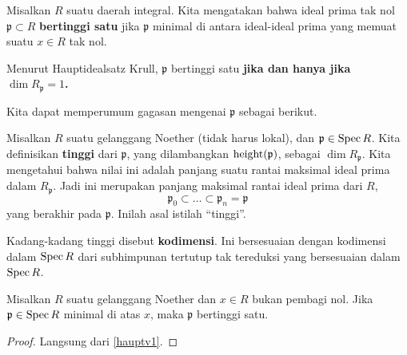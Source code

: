 \begin{remark} 
Misalkan $R$ suatu daerah integral. Kita mengatakan bahwa ideal prima tak nol $\mathfrak{p} \subset R$
\textbf{bertinggi satu} jika $\mathfrak{p}$ minimal di antara ideal-ideal prima
yang memuat suatu $x \in R$ tak nol. 

Menurut Hauptidealsatz Krull, $\mathfrak{p}$ bertinggi satu \textbf{jika
dan hanya jika $\dim R_{\mathfrak{p}} = 1$.}
\end{remark} 


Kita dapat memperumum gagasan mengenai $\mathfrak{p}$ sebagai berikut.
\begin{definition} 
Misalkan $R$ suatu gelanggang Noether (tidak harus lokal), dan $\mathfrak{p} \in
\operatorname{Spec} R$. Kita definisikan \textbf{tinggi} dari $\mathfrak{p}$, yang dilambangkan
$\operatorname{height}(\mathfrak{p})$, sebagai $\dim R_{\mathfrak{p}}$.
Kita mengetahui bahwa nilai ini adalah panjang suatu rantai maksimal ideal prima dalam
$R_{\mathfrak{p}}$. Jadi ini merupakan panjang maksimal rantai ideal prima dari $R$, 
\[ \mathfrak{p}_0 \subset \dots \subset \mathfrak{p}_n = \mathfrak{p}  \]
yang berakhir pada $\mathfrak{p}$. Inilah asal istilah ``tinggi''.
\end{definition} 

\begin{remark} 
Kadang-kadang tinggi disebut \textbf{kodimensi}. Ini bersesuaian dengan
kodimensi dalam $\operatorname{Spec} R$ dari subhimpunan tertutup tak tereduksi yang bersesuaian dalam
$\operatorname{Spec} R$.
\end{remark} 

\begin{theorem} Misalkan $R$ suatu gelanggang Noether dan $x
\in R$ bukan pembagi nol. Jika $\mathfrak{p} \in \operatorname{Spec} R$ minimal di atas $x$,
maka $\mathfrak{p}$ bertinggi satu.
\end{theorem} 
\begin{proof} 
Langsung dari \cref{hauptv1}.
\end{proof} 

